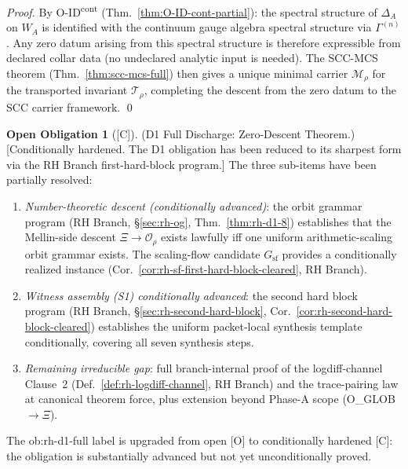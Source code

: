 \documentclass[12pt,oneside]{amsbook}
\theoremstyle{plain}
\theoremstyle{definition}
\newtheorem{obligation}[theorem]{Open Obligation}
\theoremstyle{remark}
\newcommand{\status}[1]{\textup{[#1]}}
\begin{document}
\begin{proof}
By O-ID\textsuperscript{cont} (Thm.~\ref{thm:O-ID-cont-partial}):
the spectral structure of $\Delta_A$ on $W_A$ is identified with
the continuum gauge algebra spectral structure via $\Gamma^{(n)}$.
Any zero datum arising from this spectral structure is therefore
expressible from declared collar data (no undeclared analytic
input is needed). The SCC-MCS theorem
(Thm.~\ref{thm:scc-mcs-full}) then gives a unique minimal
carrier $\mathcal{M}_\rho$ for the transported invariant
$\mathcal{T}_\rho$, completing the descent from the zero datum
to the SCC carrier framework. \qed
\end{proof}

\begin{obligation}[\status{C}]\label{ob:rh-d1-full}
\textup{(D1 Full Discharge: Zero-Descent Theorem.)}
\textup{[Conditionally hardened. The D1 obligation has been
reduced to its sharpest form via the RH Branch first-hard-block
program.]}
The three sub-items have been partially resolved:
\begin{enumerate}[label=\textup{(\arabic*)}]
 \item \emph{Number-theoretic descent (conditionally advanced)}:
 the orbit grammar program (RH Branch, \S\ref{sec:rh-og},
 Thm.~\ref{thm:rh-d1-8}) establishes that the Mellin-side
 descent $\Xi \to \mathcal{O}_\rho$ exists lawfully iff one
 uniform arithmetic-scaling orbit grammar exists. The scaling-flow
 candidate $G_{\mathrm{sf}}$ provides a conditionally realized
 instance (Cor.~\ref{cor:rh-sf-first-hard-block-cleared}, RH Branch).
 \item \emph{Witness assembly (S1) conditionally advanced}:
 the second hard block program (RH Branch, \S\ref{sec:rh-second-hard-block},
 Cor.~\ref{cor:rh-second-hard-block-cleared}) establishes the
 uniform packet-local synthesis template conditionally, covering
 all seven synthesis steps.
 \item \emph{Remaining irreducible gap}: full branch-internal proof
 of the logdiff-channel Clause~2
 (Def.~\ref{def:rh-logdiff-channel}, RH Branch) and the
 trace-pairing law at canonical theorem force, plus extension
 beyond Phase-A scope (O\_GLOB $\to \Xi$).
\end{enumerate}
The ob:rh-d1-full label is upgraded from open [O] to conditionally
hardened [C]: the obligation is substantially advanced but not yet
unconditionally proved.
\end{obligation}
\end{document}

